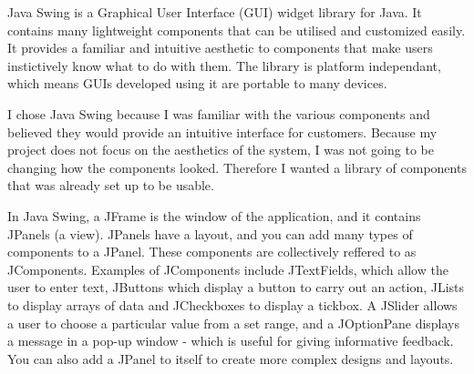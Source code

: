 Java Swing \cite{java_swing_2020} is a Graphical User Interface (GUI) widget library for Java. It contains many lightweight components that can be utilised and customized easily. It provides a familiar and intuitive aesthetic to components that make users instictively know what to do with them. The library is platform independant, which means GUIs developed using it are portable to many devices.

I chose Java Swing because I was familiar with the various components and believed they would provide an intuitive interface for customers. Because my project does not focus on the aesthetics of the system, I was not going to be changing how the components looked. Therefore I wanted a library of components that was already set up to be usable. 

In Java Swing, a JFrame is the window of the application, and it contains JPanels (a view). JPanels have a layout, and you can add many types of components to a JPanel. These components are collectively reffered to as JComponents. Examples of JComponents include JTextFields, which allow the user to enter text, JButtons which display a button to carry out an action, JLists to display arrays of data and JCheckboxes to display a tickbox. A JSlider allows a user to choose a particular value from a set range, and a JOptionPane displays a message in a pop-up window - which is useful for giving informative feedback. You can also add a JPanel to itself to create more complex designs and layouts.

